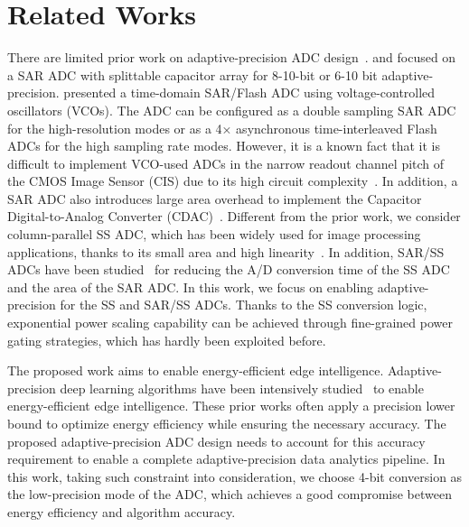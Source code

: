 \section{Related Works}\label{related}

There are limited prior work on adaptive-precision ADC design~\cite{zhu_06_2013,zhu_6--10-bit_2015,el-halwagy_100-mss5-gss_2018}. 
\cite{zhu_06_2013} and \cite{zhu_6--10-bit_2015} focused on a SAR ADC with splittable capacitor array for 8-10-bit or 6-10 bit adaptive-precision. 
\cite{el-halwagy_100-mss5-gss_2018} presented a time-domain SAR/Flash ADC using voltage-controlled oscillators (VCOs). The ADC can be configured as a double sampling SAR ADC for the high-resolution modes or as a 4× asynchronous time-interleaved Flash ADCs for the high sampling rate modes.
However, it is a known fact that it is difficult to implement VCO-used ADCs in the narrow readout channel pitch of the CMOS Image Sensor (CIS) due to its high circuit complexity~\cite{kim_area-efficient_2016}. In addition, a SAR ADC also introduces large area overhead to implement the Capacitor Digital-to-Analog Converter (CDAC)~\cite{funatsu_62_2015}.
Different from the prior work, we consider column-parallel SS ADC, which has been widely used for image processing applications, 
thanks to its small area and high linearity~\cite{kim_11-bit_2021,nie_single_2020,kumagai_14-inch_2018,park_640_2020}. 
In addition, SAR/SS ADCs have been studied~\cite{kim_area-efficient_2016,chen_12_2014} for reducing the A/D conversion time of 
the SS ADC and the area of the SAR ADC.     
In this work, we focus on enabling adaptive-precision for the SS and SAR/SS ADCs. Thanks to the SS conversion logic, exponential power 
scaling capability can be achieved through fine-grained power gating strategies, which has hardly been exploited before.


The proposed work aims to enable energy-efficient edge intelligence.  Adaptive-precision deep learning algorithms have been intensively studied~\cite{leibe_xnor-net_2016,li_ternary_2016,park_energy-efficient_2018} to enable energy-efficient edge intelligence. These prior works often apply a precision lower bound to optimize energy efficiency while ensuring the necessary accuracy.  The proposed adaptive-precision ADC design needs to account for this accuracy requirement to enable a complete adaptive-precision data analytics pipeline. In this work, taking such constraint into consideration, we choose 4-bit conversion as the low-precision mode of the ADC, which achieves a good compromise between energy efficiency and algorithm accuracy. 

